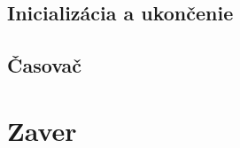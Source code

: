 \documentclass[12pt,oneside,final]{fithesis2}
\begin{document}
\section{Inicializácia a ukončenie}
\section{Časovač}

\chapter{Zaver}
\raggedright


\end{document}
